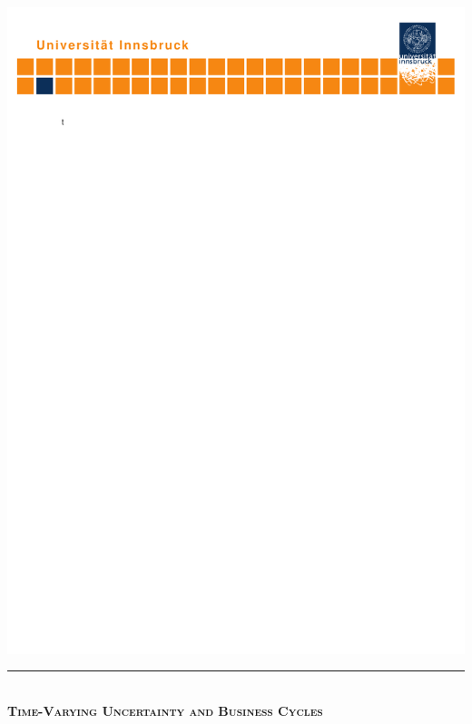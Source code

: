 \documentclass[a4paper,12pt,oneside,pointednumbers,bibtotoc,bigheadings,liststotoc]{scrbook}
\begin{document}
\begin{titlepage}
    \begin{center}
        \hspace*{-0.27\textwidth}\includegraphics[width=1.419\textwidth, trim = 5mm 250mm 0mm 0mm, clip = TRUE]{logo.pdf}\hspace*{-0.3\textwidth}
        \quad \\[0mm]
        \newcommand{\HRule}{\rule{\linewidth}{0.3mm}} %
        \HRule \\[-1mm]
        \Huge{\scshape\bfseries Time-Varying Uncertainty and Business Cycles} \\[-5mm]

\end{center}
\end{titlepage}
\end{document}

